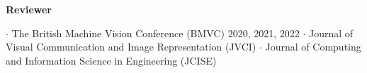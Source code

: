


\vspace{-.5em}
\textbf{Reviewer}
\begin{cvskills}
\cvskill
{} %
{\hspace{-3em} \textbf{$\cdot$} The British Machine Vision Conference (BMVC) 2020, 2021, 2022}
\cvskill
{} %
{\hspace{-3em} \textbf{$\cdot$} Journal of Visual Communication and Image Representation (JVCI)}
\cvskill
{}
{\hspace{-3em} \textbf{$\cdot$} Journal of Computing and Information Science in Engineering (JCISE)}


\end{cvskills}
